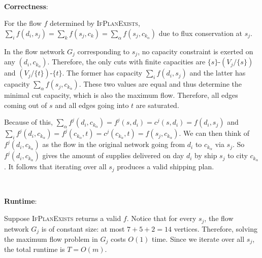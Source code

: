 \documentclass{article}
\begin{document}


~

\noindent\textbf{Correctness}:

For the flow $f$ determined by \textsc{IfPlanExists}, $\sum_if(d_i,s_j)=\sum_kf(s_j,c_k)=\sum_\alpha f(s_j,c_{k_\alpha})$ due to flux conservation at $s_j$.

In the flow network $G_j$ corresponding to $s_j$, no capacity constraint is exerted on any $(d_i,c_{k_\alpha})$. Therefore, the only cuts with finite capacities are $\{s\}$-$(V_j/\{s\})$ and $(V_j/\{t\})$-$\{t\}$. The former has capacity $\sum_if(d_i,s_j)$ and the latter has capacity $\sum_\alpha f(s_j,c_{k_\alpha})$. These two values are equal and thus determine the minimal cut capacity, which is also the maximum flow. Therefore, all edges coming out of $s$ and all edges going into $t$ are saturated.

Because of this, $\sum_\alpha f^j(d_i,c_{k_\alpha})=f^j(s,d_i)=c^j(s,d_i)=f(d_i,s_j)$ and $\sum_if^j(d_i,c_{k_\alpha})=f^j(c_{k_\alpha},t)=c^j(c_{k_\alpha},t)=f(s_j,c_{k_\alpha})$. We can then think of $f^j(d_i,c_{k_\alpha})$ as the flow in the original network going from $d_i$ to $c_{k_\alpha}$ via $s_j$. So $f^j(d_i,c_{k_\alpha})$ gives the amount of supplies delivered on day $d_i$ by ship $s_j$ to city $c_{k_\alpha}$. It follows that iterating over all $s_j$ produces a valid shipping plan.

~

\noindent\textbf{Runtime}:

Suppose \textsc{IfPlanExists} returns a valid $f$. Notice that for every $s_j$, the flow network $G_j$ is of constant size: at most $7+5+2=14$ vertices. Therefore, solving the maximum flow problem in $G_j$ costs $O(1)$ time. Since we iterate over all $s_j$, the total runtime is $T=O(m)$.
\end{document}
